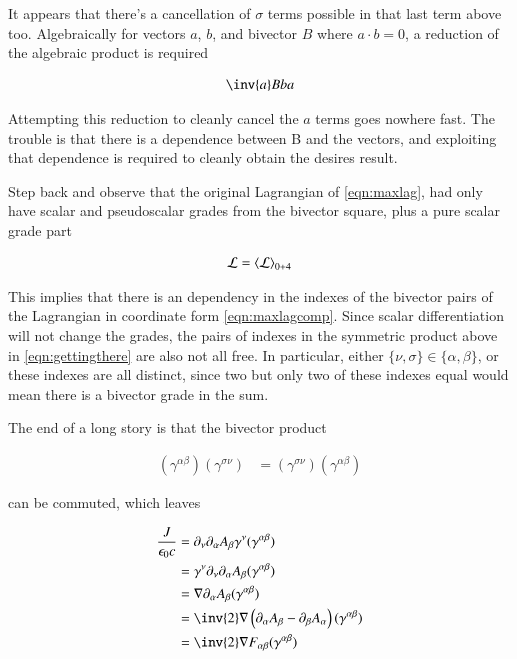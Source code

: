 \documentclass{article}
\begin{document}
It appears that there's a cancellation of $\sigma$ terms possible in that last term above too.  Algebraically
for vectors $a$, $b$, and bivector $B$ where $a \cdot b = 0$, a reduction of the algebraic product is required

\begin{align*}
\inv{a} B b a
\end{align*}

Attempting this reduction to cleanly cancel the $a$ terms goes nowhere fast.  The trouble is that there
is a dependence between B and the vectors, and exploiting that dependence is required to cleanly obtain the desires
result.

Step back and observe that the original Lagrangian of \ref{eqn:maxlag}, 
had only have scalar and pseudoscalar grades from the bivector square, plus a pure scalar grade part

\begin{align*}
\mathcal{L} = {\left\langle{{\mathcal{L}}}\right\rangle}_{0+4}
\end{align*}

This implies that there is an dependency in the indexes of the
bivector pairs of the Lagrangian in coordinate form \ref{eqn:maxlagcomp}.
Since scalar differentiation will not change the grades, the pairs
of indexes in the symmetric product above in \ref{eqn:gettingthere} are also not all free.
In particular, either $\{\nu, \sigma\} \in \{\alpha, \beta\}$, or these indexes are all distinct, since two but only two
of these indexes equal would mean there is a bivector grade in the sum.  

The end of a long story is that the bivector product

\begin{align*}
(\gamma^{\alpha\beta}) (\gamma^{\sigma\nu})
&=
(\gamma^{\sigma\nu}) (\gamma^{\alpha\beta})
\end{align*}

can be commuted, which leaves

\begin{align*}
\frac{J}{\epsilon_0 c}
&= \partial_\nu \partial_\alpha A_\beta \gamma^{\nu} (\gamma^{\alpha\beta}) \\
&= \gamma^\nu \partial_\nu \partial_\alpha A_\beta (\gamma^{\alpha\beta}) \\
&= \grad \partial_\alpha A_\beta (\gamma^{\alpha\beta}) \\
&= \inv{2} \grad \left(\partial_\alpha A_\beta - \partial_\beta A_\alpha \right) (\gamma^{\alpha\beta}) \\
&= \inv{2} \grad F_{\alpha\beta} (\gamma^{\alpha\beta}) \\
\end{align*}
\end{document}
